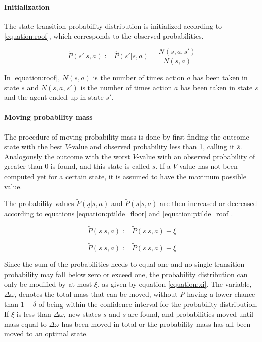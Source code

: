 \paragraph{Initialization} The state transition probability distribution is initialized according to
\eqref{equation:roof}, which corresponds to the observed probabilities.

\begin{equation}
\label{equation:roof}
\tilde{P}(s'|s, a) := \hat{P}(s'|s, a) = \frac{N(s,a,s')}{N(s,a)}
\end{equation}

In \eqref{equation:roof}, $N(s, a)$ is the number of times action $a$ has been taken in
state $s$ and $N(s, a, s')$ is the number of times action $a$ has been taken in
state $s$ and the agent ended up in state $s'$.

\paragraph{Moving probability mass} The procedure of moving probability mass is done by first finding the outcome
state with the best $V$-value and observed probability less than 1, calling it
$\overline{s}$. Analogously the outcome with the worst $V$-value with an
observed probability of greater than 0 is found, and this state is called
$\underline{s}$. If a $V$-value has not been computed yet for a certain state, it is 
assumed to have the maximum possible value. 

The probability values $\tilde{P}(\underline{s}|s,a)$ and
$\tilde{P}(\overline{s}|s,a)$ are then increased or decreased according to
equations \eqref{equation:ptilde_floor} and \eqref{equation:ptilde_roof}.

\begin{equation}
\label{equation:ptilde_floor}
\tilde{P}(\underline{s}|s,a) := \tilde{P}(\underline{s}|s,a)-\xi
\end{equation}

\begin{equation}
\label{equation:ptilde_roof}
\tilde{P}(\overline{s}|s,a) := \tilde{P}(\overline{s}|s,a)+\xi
\end{equation}

Since the sum of the probabilities needs to equal one and 
no single transition probability may fall below zero or exceed one, the probability distribution can only be modified by at most $\xi$, as given by
equation \eqref{equation:xi}. The variable, $\Delta\omega$, denotes the total mass that can be moved, without $\tilde{P}$ having a lower chance than $1 - \delta$ of being within the confidence interval for the probability distribution. If $\xi$ is less than $\Delta \omega$, new states
$\overline{s}$ and $\underline{s}$ are found, and probabilities moved until
mass equal to $\Delta \omega$ has been moved in total or the probability mass has all been moved to an optimal state. 

